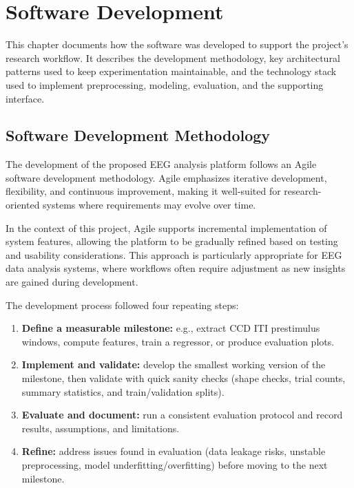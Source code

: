 \chapter{Software Development}
\label{chap:software-development}

\noindent
This chapter documents how the software was developed to support the project’s research workflow. It describes the development methodology, key architectural patterns used to keep experimentation maintainable, and the technology stack used to implement preprocessing, modeling, evaluation, and the supporting interface.
\vspace{1em}

\section{Software Development Methodology}
\label{sec:software-development-methodology}
The development of the proposed EEG analysis platform follows an Agile software development methodology. Agile emphasizes iterative development, flexibility, and continuous improvement, making it well-suited for research-oriented systems where requirements may evolve over time.

In the context of this project, Agile supports incremental implementation of system features, allowing the platform to be gradually refined based on testing and usability considerations. This approach is particularly appropriate for EEG data analysis systems, where workflows often require adjustment as new insights are gained during development.

The development process followed four repeating steps:
\begin{enumerate}[label=\textbf{M\arabic*.}, leftmargin=*]
	\item \textbf{Define a measurable milestone:} e.g., extract CCD ITI prestimulus windows, compute features, train a regressor, or produce evaluation plots.
	\item \textbf{Implement and validate:} develop the smallest working version of the milestone, then validate with quick sanity checks (shape checks, trial counts, summary statistics, and train/validation splits).
	\item \textbf{Evaluate and document:} run a consistent evaluation protocol and record results, assumptions, and limitations.
	\item \textbf{Refine:} address issues found in evaluation (data leakage risks, unstable preprocessing, model underfitting/overfitting) before moving to the next milestone.
\end{enumerate}

